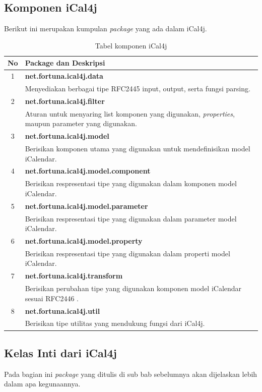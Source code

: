 \subsection{Komponen iCal4j}
\label{subs:Komponen_iCal4j}
Berikut ini merupakan kumpulan \textit{package} yang ada dalam iCal4j.\cite{ical}
\begin{table}[H]
		\centering
		\caption{Tabel komponen iCal4j}
		\label{tab:komponeniCal4j}
\begin{tabular}{|c|p{12cm}|}
		\hline
		\textbf{No} & \textbf{Package dan Deskripsi} \\ \hline \hline
		1 & \textbf{net.fortuna.ical4j.data}\\
			&	Menyediakan berbagai tipe RFC2445 input, output, serta fungsi parsing.\\ \hline
		2 & \textbf{net.fortuna.ical4j.filter}\\
			&	Aturan untuk menyaring list komponen yang digunakan, \textit{properties}, maupun parameter yang digunakan.\\ \hline
		3 & \textbf{net.fortuna.ical4j.model}\\
			&	Berisikan komponen utama yang digunakan untuk mendefinisikan model iCalendar.\\ \hline
		4 & \textbf{net.fortuna.ical4j.model.component	
}\\
			&	Berisikan respresentasi tipe yang digunakan dalam komponen model iCalendar.\\ \hline
		5 & \textbf{net.fortuna.ical4j.model.parameter}\\
			&	Berisikan respresentasi tipe yang digunakan dalam parameter model iCalendar.\\ \hline
		6 & \textbf{net.fortuna.ical4j.model.property}\\
			&	Berisikan respresentasi tipe yang digunakan dalam properti model iCalendar.\\ \hline
		7 & \textbf{net.fortuna.ical4j.transform}\\
			&	Berisikan perubahan tipe yang digunakan komponen model iCalendar sesuai RFC2446   .\\ \hline
		8 & \textbf{net.fortuna.ical4j.util}\\
			&	Berisikan tipe utilitas yang mendukung fungsi dari iCal4j.\\ \hline							
	\end{tabular}
\end{table}

\subsection{Kelas Inti dari iCal4j}
\label{subs:Kelas_inti_iCal4j}
Pada bagian ini \textit{package} yang ditulis di sub bab sebelumnya akan dijelaskan lebih dalam apa kegunaannya.\cite{ical}

